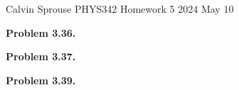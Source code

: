 \documentclass[a4paper, 12pt]{config/homework}
\begin{document}
\noindent
Calvin Sprouse \hfill PHYS342 Homework 5 \hfill 2024 May 10

\bigskip\noindent
\textbf{Problem 3.36.}

\bigskip\noindent
\textbf{Problem 3.37.}

\bigskip\noindent
\textbf{Problem 3.39.}
\end{document}
